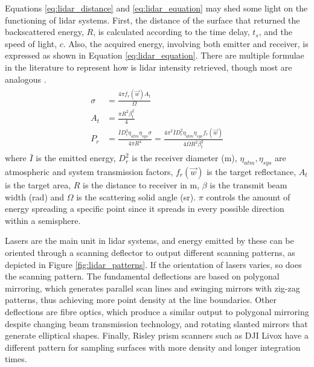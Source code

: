 Equations \ref{eq:lidar_distance} and \ref{eq:lidar_equation} may shed some light on the functioning of \acrshort{lidar} systems. First, the distance of the surface that returned the backscattered energy, $R$, is calculated according to the time delay, $t_s$, and the speed of light, $c$. Also, the acquired energy, involving both emitter and receiver, is expressed as shown in Equation \ref{eq:lidar_equation}. There are multiple formulae in the literature to represent how is \acrshort{lidar} intensity retrieved, though most are analogous \cite{hofle_correction_2007, bolkas_effect_2018, dong_lidar_2018}.
\begin{gather}
    \label{eq:lidar_equation}
    \begin{aligned}
        \sigma &= \frac{4\pi f_{r}(\vec{w})A_{t}}{\Omega}\\
        A_{t} &= \frac{\pi R^{2} \beta^{2}_{t}}{4}\\
        P_{r} &= \frac{\bar{I} D^{2}_{r} \eta_{atm} \eta_{sys} \sigma}{4 \pi R^{4}}=
        \frac{4\pi^2 \bar{I} D^{2}_{r} \eta_{atm} \eta_{sys}  f_{r}(\vec{w})}{4\Omega R^{2} \beta^{2}_{t}}
    \end{aligned}
\end{gather}
where $\bar{I}$ is the emitted energy, $D^{2}_{r}$ is the receiver diameter (\si{\meter}), $\eta_{atm}, \eta_{sys}$ are atmospheric and system transmission factors, $f_{r}(\vec{w})$ is the target reflectance, $A_{t}$ is the target area, $R$ is the distance to receiver in \si{\meter}, $\beta$ is the transmit beam width (\si{\radian}) and $\Omega$ is the scattering solid angle (\si{\steradian}). $\pi$ controls the amount of energy spreading a specific point since it spreads in every possible direction within a semisphere.

Lasers are the main unit in \acrshort{lidar} systems, and energy emitted by these can be oriented through a scanning deflector to output different scanning patterns, as depicted in Figure \ref{fig:lidar_patterns}. If the orientation of lasers varies, so does the scanning pattern. The fundamental deflections are based on polygonal mirroring, which generates parallel scan lines and swinging mirrors with zig-zag patterns, thus achieving more point density at the line boundaries. Other deflections are fibre optics, which produce a similar output to polygonal mirroring despite changing beam transmission technology, and rotating slanted mirrors that generate elliptical shapes. Finally, Risley prism scanners such as DJI Livox have a different pattern for sampling surfaces with more density and longer integration times.

